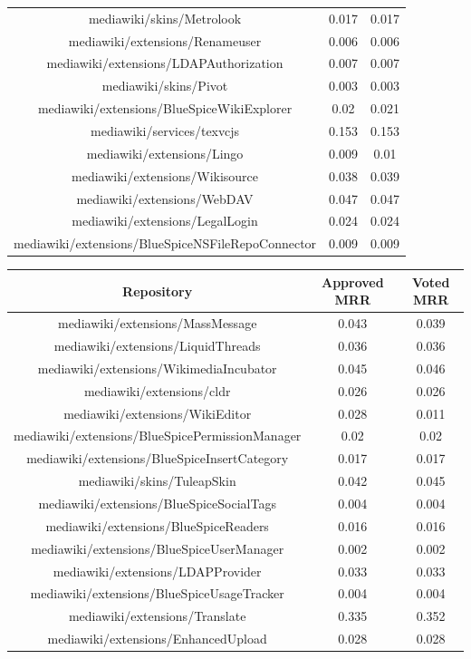 \begin{center}
\begin{tabular}{@{}c c c@{}}
mediawiki/skins/Metrolook & 0.017 & 0.017 \\
mediawiki/extensions/Renameuser & 0.006 & 0.006 \\
mediawiki/extensions/LDAPAuthorization & 0.007 & 0.007 \\
mediawiki/skins/Pivot & 0.003 & 0.003 \\
mediawiki/extensions/BlueSpiceWikiExplorer & 0.02 & 0.021 \\
mediawiki/services/texvcjs & 0.153 & 0.153 \\
mediawiki/extensions/Lingo & 0.009 & 0.01 \\
mediawiki/extensions/Wikisource & 0.038 & 0.039 \\
mediawiki/extensions/WebDAV & 0.047 & 0.047 \\
mediawiki/extensions/LegalLogin & 0.024 & 0.024 \\
mediawiki/extensions/BlueSpiceNSFileRepoConnector & 0.009 & 0.009 \\
\end{tabular}
\begin{tabular}{@{}c c c@{}} 
 \hline
    \textbf{Repository} & {Approved MRR} & {Voted MRR} \\
\hline
mediawiki/extensions/MassMessage & 0.043 & 0.039 \\
mediawiki/extensions/LiquidThreads & 0.036 & 0.036 \\
mediawiki/extensions/WikimediaIncubator & 0.045 & 0.046 \\
mediawiki/extensions/cldr & 0.026 & 0.026 \\
mediawiki/extensions/WikiEditor & 0.028 & 0.011 \\
mediawiki/extensions/BlueSpicePermissionManager & 0.02 & 0.02 \\
mediawiki/extensions/BlueSpiceInsertCategory & 0.017 & 0.017 \\
mediawiki/skins/TuleapSkin & 0.042 & 0.045 \\
mediawiki/extensions/BlueSpiceSocialTags & 0.004 & 0.004 \\
mediawiki/extensions/BlueSpiceReaders & 0.016 & 0.016 \\
mediawiki/extensions/BlueSpiceUserManager & 0.002 & 0.002 \\
mediawiki/extensions/LDAPProvider & 0.033 & 0.033 \\
mediawiki/extensions/BlueSpiceUsageTracker & 0.004 & 0.004 \\
mediawiki/extensions/Translate & 0.335 & 0.352 \\
mediawiki/extensions/EnhancedUpload & 0.028 & 0.028 \\

\end{tabular}
\end{center}
